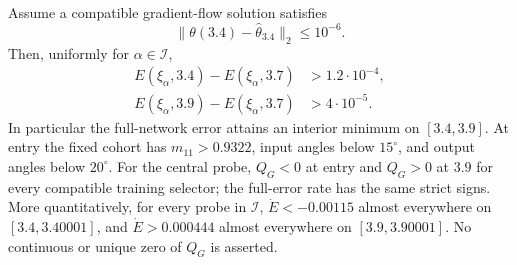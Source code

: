 \begin{theorem}
\label{thm:local-certificate}
Assume a compatible gradient-flow solution satisfies
\begin{equation}\label{eq:entry-missing}
 \|\theta(3.4)-\widehat\theta_{3.4}\|_2\le10^{-6}.
\end{equation}
Then, uniformly for $\alpha\in\mathcal I$,
\begin{align*}
 E(\xi_\alpha,3.4)-E(\xi_\alpha,3.7)&>1.2\cdot10^{-4},\\
 E(\xi_\alpha,3.9)-E(\xi_\alpha,3.7)&>4\cdot10^{-5}.
\end{align*}
In particular the full-network error attains an interior minimum on
$[3.4,3.9]$. At entry the fixed cohort has $m_{11}>0.9322$, input angles
below $15^\circ$, and output angles below $20^\circ$.
For the central probe, $Q_G<0$ at entry and $Q_G>0$ at $3.9$ for every
compatible training selector; the full-error rate has the same strict signs.
More quantitatively, for every probe in $\mathcal I$,
$\dot E<-0.00115$ almost everywhere on $[3.4,3.40001]$, and
$\dot E>0.000444$ almost everywhere on $[3.9,3.90001]$.
No continuous or unique zero of $Q_G$ is asserted.
\end{theorem}
